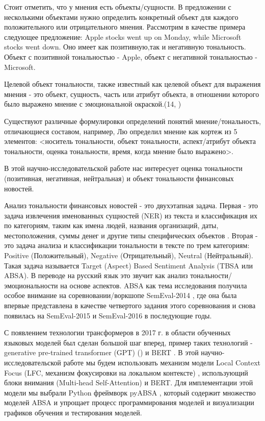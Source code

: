 Стоит отметить, что у мнения есть объекты/сущности. В предложении с несколькими объектами нужно определить конкретный объект для каждого положительного или отрицательного мнения. Рассмотрим в качестве примера следующее предложение: \flqq Apple stocks went up on Monday,  while Microsoft stocks went down\frqq. Оно имеет как позитивную,так и негативную тональность. Объект с позитивной тональностью - Apple, объект с негативной тональностью - Microsoft.

\begin{definition}
Целевой объект тональности, также известный как целевой объект для выражения мнения - это объект, сущность, часть или атрибут объекта, в отношении которого было выражено мнение с эмоциональной окраской.(14, \cite{10.5555/3110802})
\end{definition}

Существуют различные формулировки определений понятий \flqq мнение/тональность\frqq, отличающиеся составом, например,
Лю определил мнение как кортеж из 5 элементов: <носитель тональности, объект тональности, аспект/атрибут объекта тональности, оценка тональности, время, когда мнение было выражено>\cite{inbook}.

В этой научно-исследовательской работе нас интересует оценка тональности (позитивная, негативная, нейтральная) и объект тональности финансовых новостей.

Анализ тональности финансовых новостей - это двухэтапная задача. Первая - это задача извлечения именованных сущностей (NER) из текста и классификация их по категориям, таким как имена людей, названия организаций, даты, местоположения, суммы денег и другие типы специфических объектов \cite{microsoft}. Вторая - это  задача  анализа и классификации тональности в тексте по трем категориям: Positive (Положительный), Negative (Отрицательный), Neutral (Нейтральный). Такая задача называется Target (Aspect) Based Sentiment Analysis (TBSA или ABSA). В переводе на русский язык это звучит как анализ тональности/эмоциональности на основе аспектов. ABSA как тема исследования получила особое внимание на соревновании/воркшопе SemEval-2014 \cite{pontiki-etal-2014-semeval}, где она была впервые представлена в качестве четвертого задания этого соревнования и снова появилась на SemEval-2015 \cite{pontiki-etal-2015-semeval} и SemEval-2016 \cite{pontiki-etal-2016-semeval} в последующие годы. 

С появлением технологии трансформеров в 2017 г. \cite{GoogleBrain} в области обученных языковых моделей был сделан большой шаг вперед, пример таких технологий - generative pre-trained transformer (GPT) (\cite{radford2018improving}) и BERT \cite{devlin-etal-2019-bert}. В этой научно-исследовательской работе мы будем использовать механизм модели Local Context Focus (LFC, механизм фокусировки на локальном контексте) \cite{Zeng2019LCFAL}, использующий блоки внимания (Multi-head Self-Attention) и BERT. Для имплементации этой модели мы выбрали Python фреймворк pyABSA \cite{YangL22}, который содержит множество моделей ABSA и упрощает процесс программирования моделей и визуализации графиков обучения и тестирования моделей. 

